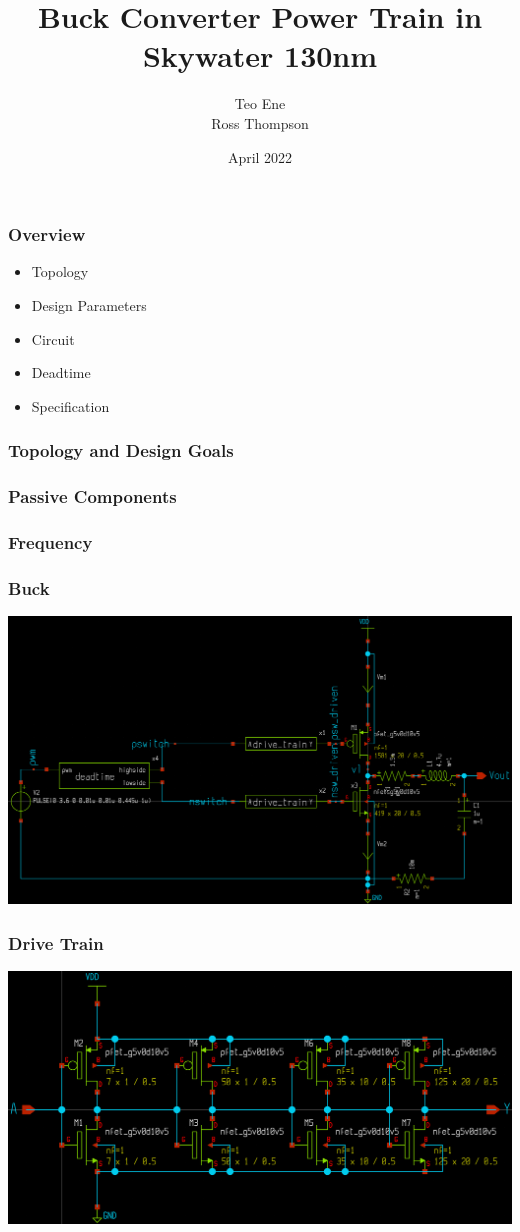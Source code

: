 \documentclass{beamer}
\title{Buck Converter Power Train in Skywater 130nm}
\author{Teo Ene \\
  Ross Thompson}
\institute{Oklahoma State University}
\date{April 2022}
\begin{document}
\frame{\titlepage}

\begin{frame}
  \frametitle{Overview}
  \begin{itemize}
  \item Topology
  \item Design Parameters
  \item Circuit
  \item Deadtime
  \item Specification
  \end{itemize}
\end{frame}

\begin{frame}
  \frametitle{Topology and Design Goals}
\end{frame}

\begin{frame}
  \frametitle{Passive Components}
\end{frame}

\begin{frame}
  \frametitle{Frequency}
\end{frame}

\begin{frame}
  \frametitle{Buck}
  \includegraphics[scale=0.08]{buck.png}
\end{frame}

\begin{frame}
  \frametitle{Drive Train}
  \includegraphics[scale=0.08]{drive-train.png}
\end{frame}
\end{document}
